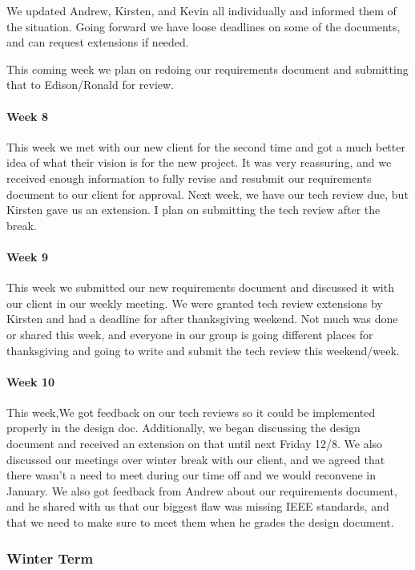 \documentclass[onecolumn, draftclsnofoot,10pt, compsoc]{IEEEtran}
\begin{document}
        We updated Andrew, Kirsten, and Kevin all individually and informed them of the situation. Going forward we have loose deadlines on some of the documents, and can request extensions if needed. 
 
        This coming week we plan on redoing our requirements document and submitting that to Edison/Ronald for review. 
    
    \paragraph{Week 8}
        This week we met with our new client for the second time and got a much better idea of what their vision is for the new project. It was very reassuring, and we received enough information to fully revise and resubmit our requirements document to our client for approval. Next week, we have our tech review due, but Kirsten gave us an extension. I plan on submitting the tech review after the break. 

            
    \paragraph{Week 9}
        This week we submitted our new requirements document and discussed it with our client in our weekly meeting. We were granted tech review extensions by Kirsten and had a deadline for after thanksgiving weekend. Not much was done or shared this week, and everyone in our group is going different places for thanksgiving and going to write and submit the tech review this weekend/week. 

            
            
    \paragraph{Week 10}
        This week,We got feedback on our tech reviews so it could be implemented properly in the design doc. Additionally, we began discussing the design document and received an extension on that until next Friday 12/8. We also discussed our meetings over winter break with our client, and we agreed that there wasn't a need to meet during our time off and we would reconvene in January. We also got feedback from Andrew about our requirements document, and he shared with us that our biggest flaw was missing IEEE standards, and that we need to make sure to meet them when he grades the design document. 
        
        
\subsubsection{Winter Term}
\end{document}
